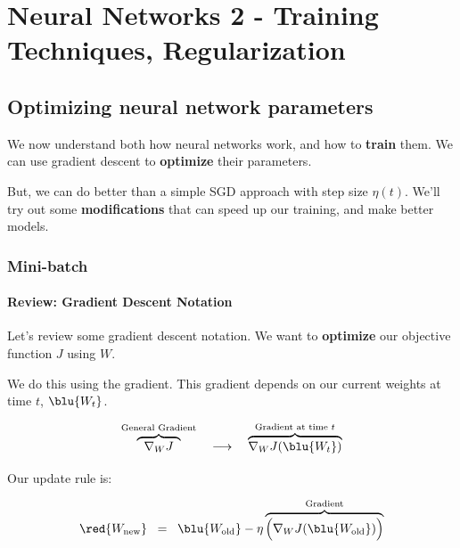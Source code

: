 \setcounter{chapter}{7-1}

\chapter{Neural Networks 2 - Training Techniques, Regularization}

\setcounter{section}{6}

\section{Optimizing neural network parameters}

    We now understand both how neural networks work, and how to \textbf{train} them. We can use gradient descent to \textbf{optimize} their parameters.
    
    But, we can do better than a simple SGD approach with step size $\eta(t)$. We'll try out some \textbf{modifications} that can speed up our training, and make better models.
    
    \secdiv
    
    \subsection{Mini-batch}
    
        \subsubsection{Review: Gradient Descent Notation}
        
            Let's review some gradient descent notation. We want to \textbf{optimize} our objective function $J$ using $W$.
            
            We do this using the gradient. This gradient depends on our current weights at time $t$, $\blu{W_{t}}$.
            
            \begin{equation}
                \overbrace{
                    \;\;
                    \nabla_W J
                    \;\;
                }^{\text{General Gradient}}
                \quad
                \longrightarrow
                \quad
                \overbrace{
                    \nabla_W J ( \blu{ W_{t} } )
                }^{\text{Gradient at time $t$}}
            \end{equation}
            
            Our update rule is:
            
            \begin{equation}
                \red{ W_{\text{new}} }
                \;\;=\;\;
                \blu{ W_{\text{old}} }
                -
                \eta
                \overbrace{
                    \Big(
                        \nabla_W J ( \blu{ W_{\text{old}} } )
                    \Big)
                }^{\text{Gradient}} 
            \end{equation}
            
